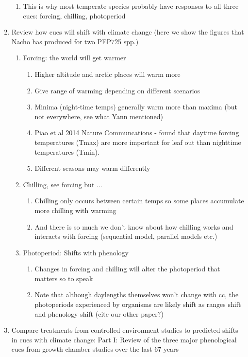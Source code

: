\documentclass[11pt,letterpaper]{article}
\begin{document}
\begin{enumerate}
\begin{enumerate}
\item This is why most temperate species probably have responses to all three cues: forcing, chilling, photoperiod
\end{enumerate}
\item Review how cues will shift with climate change (here we show the figures that Nacho has produced for two PEP725 spp.)
\begin{enumerate}
\item Forcing: the world will get warmer 
\begin{enumerate}
\item Higher altitude and arctic places will warm more
\item Give range of warming depending on different scenarios
\item Minima (night-time temps) generally warm more than maxima (but not everywhere, see what Yann mentioned)
\item Piao et al 2014 Nature Communcations - found that daytime forcing temperatures (Tmax) are more important for leaf out than nighttime temperatures (Tmin).
\item Different seasons may warm differently
\end{enumerate}
\item Chilling, see forcing but ... 
\begin{enumerate}
\item Chilling only occurs between certain temps so some places accumulate more chilling with warming
\item And there is so much we don't know about how chilling works and interacts with forcing (sequential model, parallel models etc.)
\end{enumerate}
\item Photoperiod: Shifts with phenology
\begin{enumerate}
\item Changes in forcing and chilling will alter the photoperiod that matters so to speak
\item Note that although daylengths themselves won't change with cc, the photoperiods experienced by organisms are likely shift as ranges shift and phenology shift (cite our other paper?)
\end{enumerate}
\end{enumerate}
\item Compare treatments from controlled environment studies to predicted shifts in cues with climate change: Part I: Review of the three major phenological cues from growth chamber studies over the last 67 years %

\end{enumerate}
\end{document}
